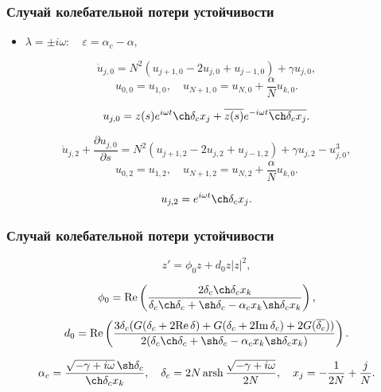\documentclass[fullscreen=true, unicode, bookmarks=false]{beamer}
\DeclareMathOperator{\arsh}{arsh}
\begin{document}
\begin{frame}
\frametitle{ Случай колебательной потери устойчивости }

\begin{itemize}
\item { $ \lambda = \pm i \omega: \quad \varepsilon=\alpha_c-\alpha, $
}
\end{itemize}

$$
\dot u_{j,0} = N^2(u_{j+1,0} - 2u_{j,0} + u_{j-1,0}) + \gamma u_{j,0},
$$
$$
u_{0,0} = u_{1,0}, \quad u_{N+1,0} = u_{N,0} + \dfrac{\alpha}{N}u_{k,0}.
$$

\vfill

$$ u_{j,0} = z(s) e^{i \omega t} \ch \delta_c x_j + \overline{z(s)} e^{-i \omega t} \overline{\ch \delta_c x_j}. $$

$$
\dot u_{j,2} + \frac{\partial u_{j,0}}{\partial s} = N^2(u_{j+1,2} - 2u_{j,2} + u_{j-1,2}) + \gamma u_{j,2} - u_{j,0}^3,
$$
$$
u_{0,2} = u_{1,2}, \quad u_{N+1,2} = u_{N,2} + \dfrac{\alpha}{N}u_{k,0}.
$$

\vfill

$$ u_{j,2} = e^{i \omega t} \ch \delta_c x_j. $$

\end{frame}

\begin{frame}
\frametitle{ Случай колебательной потери устойчивости }

\begin{equation}
	z' = \phi_0 z + d_0 z |z|^2,
\end{equation}

\vfill

$$ \phi_0 = \mbox{Re} \left(\dfrac{2 \delta_c \ch \delta_c x_k}{\delta_c\ch \delta_c + \sh \delta_c - \alpha_c x_k \sh \delta_c x_k} \right), $$
$$ d_0 = \mbox{Re} \left( \dfrac{3 \delta_c (G(\delta_c + 2 \mbox{Re}\,\delta) + G(\delta_c + 2 \mbox{Im}\,\delta_c) + 2G(\overline{\delta_c}) )}{2(\delta_c\ch \delta_c + \sh \delta_c - \alpha_c x_k \sh \delta_c x_k)} \right). $$

\vfill

$$ \alpha_c = \frac{ \sqrt{-\gamma + i \omega} \, \sh \delta_c }{ \ch\delta_c x_k }, \quad  \delta_c = 2N \arsh \dfrac{\sqrt{-\gamma + i \omega}}{2N}, \quad x_j = -\dfrac{1}{2N} + \dfrac{j}{N}. $$

\end{frame}
\end{document}
